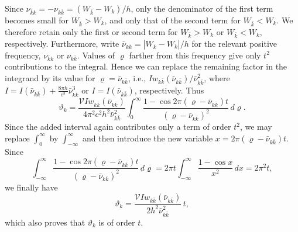 \documentclass[fontsize=13pt,twoside,openany,headings=normal,parskip=false,bookmarkpackage=false,DIV=calc]{scrbook}
\begin{document}
Since $\nu_{\bar k k}=-\nu_{k\bar k}=(W_{\bar k}-W_k)/h$, only the denominator of the first term becomes small for $W_{\bar k}>W_k$, and only that of the second term for $W_{\bar k}<W_k$. We therefore retain only the first or second term for $W_{\bar k}>W_k$ or $W_{\bar k}<W_k$, respectively. Furthermore, write $\bar\nu_{k\bar k}=|W_{\bar k}-W_k|/h$ for the relevant positive frequency, $\nu_{\bar k k}$ or $\nu_{k\bar k}$. Values of $\varrho$ farther from this frequency give only $t^2$ contributions to the integral. Hence we can replace the remaining factor in the \hypertarget{origpage-155}{}integrand by its value for $\varrho=\bar\nu_{k\bar k}$, i.e., $I w_{k\bar k}(\bar\nu_{k\bar k})/\bar\nu_{k\bar k}^{2}$, where $I=I(\bar\nu_{k\bar k})+\frac{8\pi h}{c^3}\bar\nu_{k\bar k}^{3}$ or $I=I(\bar\nu_{k\bar k})$, respectively. Thus
\[
 \vartheta_k=\frac{\mathcal V I w_{k\bar k}(\bar\nu_{k\bar k})}{4\pi^2c^2h^2\bar\nu_{k\bar k}^{2}}
 \int_0^{\infty}\frac{1-\cos2\pi(\varrho-\bar\nu_{k\bar k})t}{(\varrho-\bar\nu_{k\bar k})^2}\,d\varrho.
\]
Since the added interval again contributes only a term of order $t^2$, we may replace $\int_0^{\infty}$ by $\int_{-\infty}^{\infty}$ and then introduce the new variable $x=2\pi(\varrho-\bar\nu_{k\bar k})t$. Since
\[
 \int_{-\infty}^{\infty}\frac{1-\cos2\pi(\varrho-\bar\nu_{k\bar k})t}{(\varrho-\bar\nu_{k\bar k})^2}\,d\varrho
 =2\pi t\int_{-\infty}^{\infty}\frac{1-\cos x}{x^2}\,dx=2\pi^2t,
\]
we finally have
\[
 \vartheta_k=\frac{\mathcal V I w_{k\bar k}(\bar\nu_{k\bar k})}{2h^2\bar\nu_{k\bar k}^{2}}\,t,
\]
which also proves that $\vartheta_k$ is of order $t$.
\end{document}
